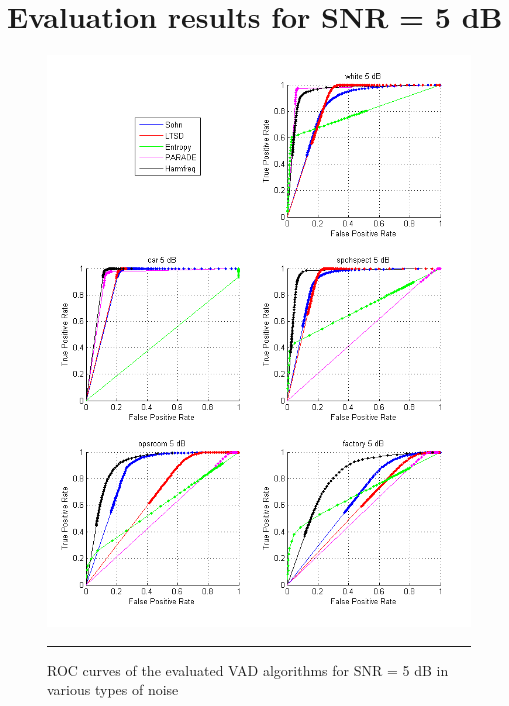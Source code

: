 \section{Evaluation results for SNR = 5 dB}

\begin{figure}[htbp]
	\centering
		\includegraphics[width=1.0\columnwidth]{Figures/Chapter3/5dB.png}
		\rule{37em}{0.5pt}
	\caption[ROC curves of the evaluated VAD algorithms for SNR = 5 dB in various types of noise]{ROC curves of the evaluated VAD algorithms for SNR = 5 dB in various types of noise}
	\label{fig:5dB}
\end{figure}